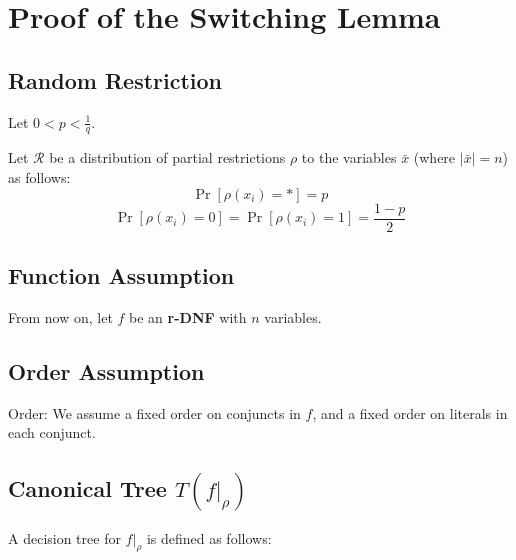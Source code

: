 

\section*{Proof of the Switching Lemma}

\subsection*{Random Restriction}
Let \( 0 < p < \frac{1}{q} \).

Let \(\mathcal{R}\) be a distribution of partial restrictions
\(\rho\) to the variables \( \bar{x} \) (where \( |\bar{x}| = n \)) as follows:
\[
\Pr[\rho(x_i) = *] = p
\]
\[
\Pr[\rho(x_i) = 0] = \Pr[\rho(x_i) = 1] = \frac{1 - p}{2}
\]

\subsection*{Function Assumption}
From now on, let \( f \) be an \textbf{r-DNF} with \( n \) variables.

\subsection*{Order Assumption}
Order: We assume a fixed order on conjuncts in \( f \),
and a fixed order on literals in each conjunct.

\subsection*{Canonical Tree \( T(f|_{\rho}) \)}

A decision tree for \( f|_{\rho} \) is defined as follows:

